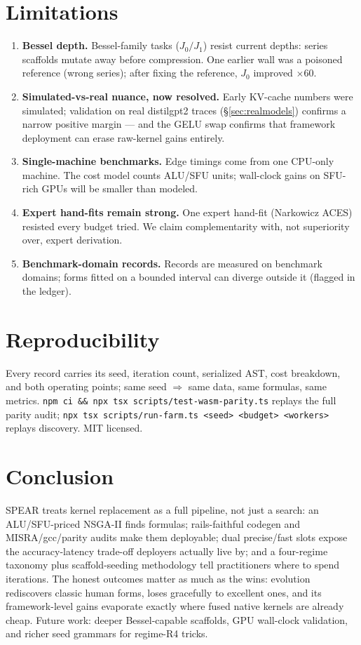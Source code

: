 \documentclass[11pt]{article}
\begin{document}
\section{Limitations}
\begin{enumerate}
\item \textbf{Bessel depth.} Bessel-family tasks ($J_0/J_1$) resist current depths: series scaffolds mutate away before compression. One earlier wall was a poisoned reference (wrong series); after fixing the reference, $J_0$ improved $\times60$.
\item \textbf{Simulated-vs-real nuance, now resolved.} Early KV-cache numbers were simulated; validation on real distilgpt2 traces (\S\ref{sec:realmodels}) confirms a narrow positive margin --- and the GELU swap confirms that framework deployment can erase raw-kernel gains entirely.
\item \textbf{Single-machine benchmarks.} Edge timings come from one CPU-only machine. The cost model counts ALU/SFU units; wall-clock gains on SFU-rich GPUs will be smaller than modeled.
\item \textbf{Expert hand-fits remain strong.} One expert hand-fit (Narkowicz ACES) resisted every budget tried. We claim complementarity with, not superiority over, expert derivation.
\item \textbf{Benchmark-domain records.} Records are measured on benchmark domains; forms fitted on a bounded interval can diverge outside it (flagged in the ledger).
\end{enumerate}

\section{Reproducibility}
Every record carries its seed, iteration count, serialized AST, cost breakdown, and both operating points; same seed $\Rightarrow$ same data, same formulas, same metrics. \texttt{npm ci \&\& npx tsx scripts/test-wasm-parity.ts} replays the full parity audit; \texttt{npx tsx scripts/run-farm.ts <seed> <budget> <workers>} replays discovery. MIT licensed.

\section{Conclusion}
SPEAR treats kernel replacement as a full pipeline, not just a search: an ALU/SFU-priced NSGA-II finds formulas; rails-faithful codegen and MISRA/gcc/parity audits make them deployable; dual precise/fast slots expose the accuracy-latency trade-off deployers actually live by; and a four-regime taxonomy plus scaffold-seeding methodology tell practitioners where to spend iterations. The honest outcomes matter as much as the wins: evolution rediscovers classic human forms, loses gracefully to excellent ones, and its framework-level gains evaporate exactly where fused native kernels are already cheap. Future work: deeper Bessel-capable scaffolds, GPU wall-clock validation, and richer seed grammars for regime-R4 tricks.



\end{document}
